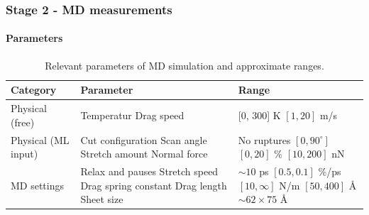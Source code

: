 \documentclass[
	10pt, %
]{beamer}
\begin{document}
\begin{frame}
	\frametitle{Stage 2 - MD measurements}
	\framesubtitle{Parameters} %
	
	\begin{table}
		\begin{tabular}{| l | p{35mm} | p{30mm} |} \hline
			\textbf{Category} & \textbf{Parameter} & \textbf{Range} \\ \hline
			Physical (free) & 
			Temperatur 		 		\newline 
			Drag speed 				&
			[0, 300] K 				\newline 
			$[1, 20]$ m/s				\\ \hline

			Physical (ML input) &
			Cut configuration 		\newline
			Scan angle 				\newline
			Stretch amount 			\newline
			Normal force 			&
			No ruptures 			\newline
			$[0, 90^{\circ}]$ 		\newline
			$[0, 20]$ \% 				\newline
			$[10, 200]$ nN 			\\ \hline

			MD settings &
			Relax and pauses \newline
			Stretch speed \newline
			Drag spring constant \newline
			Drag length \newline
			Sheet size &
			$\sim 10$ ps			\newline
			$[0.5, 0.1]$ \%/ps  	\newline
			$[10, \infty]$ N/m 		\newline
			$[50, 400]$ Å 			\newline
			$\sim 62 \times 75$ Å	\\ \hline
		\end{tabular}
		\caption{Relevant parameters of MD simulation and approximate ranges.}
	\end{table}
	
	
\end{frame}



	
\end{document}
